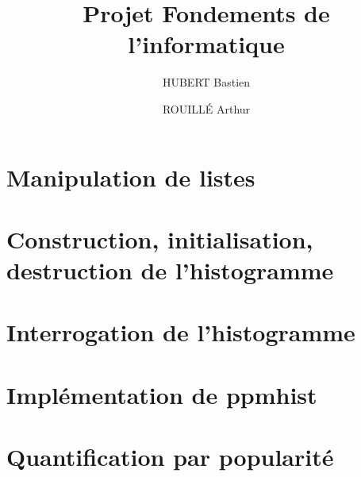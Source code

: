 \documentclass[11pt,a4paper]{report}
\begin{document}
\title{Projet Fondements de l'informatique}
\author{HUBERT Bastien\and ROUILLÉ Arthur}
\maketitle
\section{Manipulation de listes}
\section{Construction, initialisation, destruction de l'histogramme}
\section{Interrogation de l'histogramme}
\section{Implémentation de ppmhist}
\section{Quantification par popularité}
\end{document}
